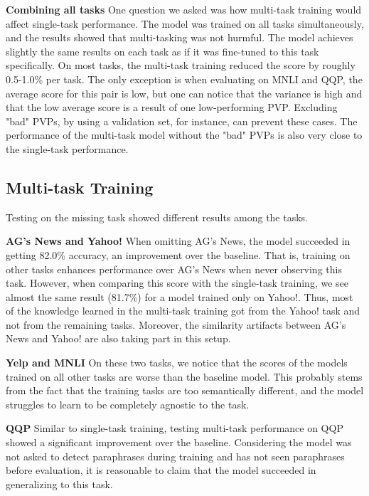 \documentclass[11pt,a4paper]{article}
\newcommand{\subtitle}[1]{\vspace{5pt}\noindent\textbf{#1}\quad}
\begin{document}
\subtitle{Combining all tasks}
One question we asked was how multi-task training would affect single-task performance.
The model was trained on all tasks simultaneously, and the results showed that multi-tasking was not hurmful.
The model achieves slightly the same results on each task as if it was fine-tuned to this task specifically.
On most tasks, the multi-task training reduced the score by roughly 0.5-1.0\% per task.
The only exception is when evaluating on MNLI and QQP, the average score for this pair is low, but one can notice that the variance is high and that the low average score is a result of one low-performing PVP.
Excluding "bad" PVPs, by using a validation set, for instance, can prevent these cases.
The performance of the multi-task model without the "bad" PVPs is also very close to the single-task performance.


\subsection{Multi-task Training}
Testing on the missing task showed different results among the tasks.
 
\subtitle{AG's News and Yahoo!}
When omitting AG's News, the model succeeded in getting 82.0\% accuracy, an improvement over the baseline.
That is, training on other tasks enhances performance over AG's News when never observing this task.
However, when comparing this score with the single-task training, we see almost the same result (81.7\%) for a model trained only on Yahoo!.
Thus, most of the knowledge learned in the multi-task training got from the Yahoo! task and not from the remaining tasks.
Moreover, the similarity artifacts between AG's News and Yahoo! are also taking part in this setup.

\subtitle{Yelp and MNLI}
On these two tasks, we notice that the scores of the models trained on all other tasks are worse than the baseline model.
This probably stems from the fact that the training tasks are too semantically different, and the model struggles to learn to be completely agnostic to the task.


\subtitle{QQP}
Similar to single-task training, testing multi-task performance on QQP showed a significant improvement over the baseline.
Considering the model was not asked to detect paraphrases during training and has not seen paraphrases before evaluation, it is reasonable to claim that the model succeeded in generalizing to this task.\\
\end{document}
